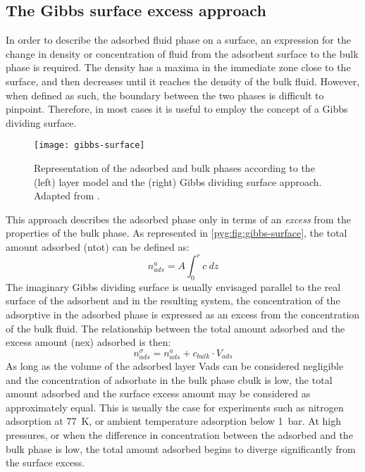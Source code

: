 \subsection{The Gibbs surface excess approach}\label{pyg:models:gibbs}

In order to describe the adsorbed fluid phase on a surface, 
an expression for the change in density or concentration of fluid
from the adsorbent surface to the bulk phase is required. The density
has a maxima in the immediate zone close to the surface, and then
decreases until it reaches the density of the bulk fluid.
However, when defined as such, the boundary between the
two phases is difficult to pinpoint.
Therefore, in most cases it is useful to employ the concept
of a Gibbs dividing surface.

\begin{figure}[htb]
	\centering
	\texttt{[image: gibbs-surface]}
	\caption{
		Representation of the adsorbed and bulk phases according to
		the (left) layer model and the (right) Gibbs dividing surface
		approach. Adapted from \citet{rouquerolAdsorptionPowdersPorous2013}.
	}\label{pyg:fig:gibbs-surface}
\end{figure}

This approach describes the adsorbed phase only in terms
of an \textit{excess} from the properties of the bulk phase.
As represented in \autoref{pyg:fig:gibbs-surface}, the total
amount adsorbed (\gls{ntot}) can be defined as:
%
\begin{equation}
	n_{ads}^{a} = A \int_0^r c\ dz
\end{equation}
%
The imaginary Gibbs dividing surface is usually envisaged parallel to
the real surface of the adsorbent and in the resulting system, the
concentration of the adsorptive in the adsorbed phase is
expressed as an excess from the concentration of the bulk fluid.
The relationship between the total amount adsorbed and the
excess amount (\gls{nex}) adsorbed is then:
%
\begin{equation}\label{pyg:eqn:total-excess}
	n_{ads}^{\sigma} = n_{ads}^{a} +  c_{bulk} \cdot V_{ads}
\end{equation}
%
As long as the volume of the adsorbed layer \gls{Vads} can be
considered negligible and the concentration of adsorbate in the bulk
phase \gls{cbulk} is low, the total amount adsorbed and the surface
excess amount may be considered as approximately equal.
This is usually the case for experiments such as nitrogen
adsorption at \SI{77}{\kelvin}, or ambient temperature adsorption
below \SI{1}{\bar}.
At high pressures, or when the difference in concentration between
the adsorbed and the bulk phase is low, the total amount adsorbed
begins to diverge significantly from the surface excess.

